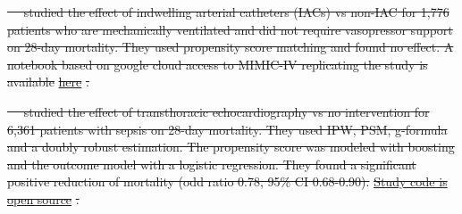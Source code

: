 \documentclass[10pt,letterpaper]{article}
\providecommand{\DIFdeltex}[1]{{\protect\color{red}\sout{#1}}}                      %
\providecommand{\DIFdelbegin}{} %
\providecommand{\DIFdelend}{} %
\providecommand{\DIFdel}[1]{\texorpdfstring{\DIFdeltex{#1}}{}} %
\newcommand{\DIFscaledelfig}{0.5}
\newlength{\DIFdelgraphicswidth} %
\newlength{\DIFdelgraphicsheight} %
\newcommand{\DIFdelincludegraphics}[2][]{%
\sbox{\DIFdelgraphicsbox}{\DIFOincludegraphics[#1]{#2}}%
\settoboxwidth{\DIFdelgraphicswidth}{\DIFdelgraphicsbox} %
\settoboxtotalheight{\DIFdelgraphicsheight}{\DIFdelgraphicsbox} %
\scalebox{\DIFscaledelfig}{%
\parbox[b]{\DIFdelgraphicswidth}{\usebox{\DIFdelgraphicsbox}\\[-\baselineskip] \rule{\DIFdelgraphicswidth}{0em}}\llap{\resizebox{\DIFdelgraphicswidth}{\DIFdelgraphicsheight}{%
\setlength{\unitlength}{\DIFdelgraphicswidth}%
\begin{picture}(1,1)%
\thicklines\linethickness{2pt} %
{\color[rgb]{1,0,0}\put(0,0){\framebox(1,1){}}}%
{\color[rgb]{1,0,0}\put(0,0){\line( 1,1){1}}}%
{\color[rgb]{1,0,0}\put(0,1){\line(1,-1){1}}}%
\end{picture}%
}\hspace*{3pt}}} %
} %
\DeclareRobustCommand{\DIFdelbegin}{\DIFOdelbegin \let\includegraphics\DIFdelincludegraphics} %
\DeclareRobustCommand{\DIFdelend}{\DIFOaddend \let\includegraphics\DIFOincludegraphics} %
\begin{document}
\DIFdelbegin %
\DIFdel{\mbox{%
    \cite{hsu2015association} }\hskip0pt%
  studied the effect of \textcolor{I}{indwelling
    arterial catheters (IACs)} vs \textcolor{C}{non-IAC} for
  \textcolor{P}{1,776 patients who are mechanically ventilated and did
    not require vasopressor support} on \textcolor{O}{28-day mortality}.
  They used propensity score matching and found no effect. A notebook based on google cloud access to MIMIC-IV
  replicating the study is available }\href{https://github.com/alistairewj/mimic-iv-aline-study/blob/main/mimic_iv_aline.ipynb}{\DIFdel{here}}%
\DIFdel{.
}\DIFdelend %

\DIFdelbegin %
\DIFdel{\mbox{%
    \cite{feng2018transthoracic} }\hskip0pt%
  studied the effect of
  \textcolor{I}{transthoracic echocardiography} vs \textcolor{C}{no
    intervention} for \textcolor{P}{6,361 patients with sepsis} on
  \textcolor{O}{28-day mortality}. They used IPW, PSM, g-formula and a
  doubly robust estimation. The propensity score was modeled with boosting
  and the outcome model with a logistic regression. They
  found a significant positive reduction of mortality (odd ratio 0.78, 95\% CI 0.68-0.90).
}\href{https://github.com/nus-mornin-lab/echo-mimiciii}{\DIFdel{Study code is
    open source}}%
\DIFdel{.
}\DIFdelend %
\end{document}
